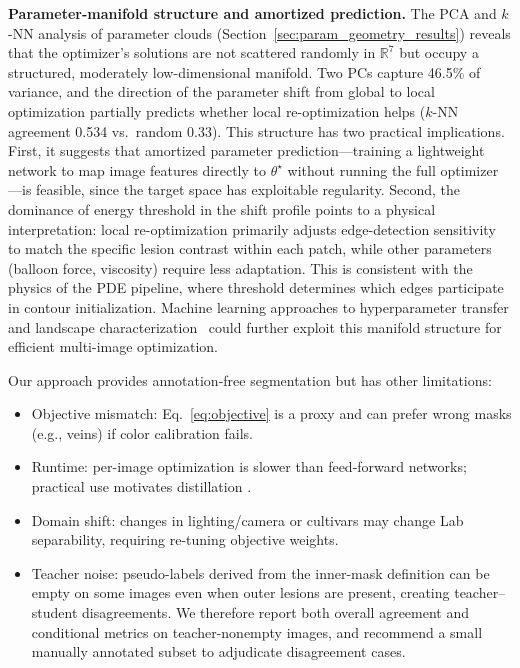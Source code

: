 \documentclass[11pt,a4paper]{article}
\newcommand{\R}{\mathbb{R}}
\begin{document}
\textbf{Parameter-manifold structure and amortized prediction.}
The PCA and $k$-NN analysis of parameter clouds (Section~\ref{sec:param_geometry_results}) reveals that the optimizer's solutions are not scattered randomly in $\R^7$ but occupy a structured, moderately low-dimensional manifold. Two PCs capture 46.5\% of variance, and the direction of the parameter shift from global to local optimization partially predicts whether local re-optimization helps ($k$-NN agreement 0.534 vs.\ random 0.33). This structure has two practical implications. First, it suggests that amortized parameter prediction---training a lightweight network to map image features directly to $\theta^\star$ without running the full optimizer---is feasible, since the target space has exploitable regularity. Second, the dominance of energy threshold in the shift profile points to a physical interpretation: local re-optimization primarily adjusts edge-detection sensitivity to match the specific lesion contrast within each patch, while other parameters (balloon force, viscosity) require less adaptation. This is consistent with the physics of the PDE pipeline, where threshold determines which edges participate in contour initialization. Machine learning approaches to hyperparameter transfer and landscape characterization~\citep{yu2020hyperparam,singh2016machine} could further exploit this manifold structure for efficient multi-image optimization.

Our approach provides annotation-free segmentation but has other limitations:
\begin{itemize}
    \item Objective mismatch: Eq.~\eqref{eq:objective} is a proxy and can prefer wrong masks (e.g., veins) if color calibration fails.
    \item Runtime: per-image optimization is slower than feed-forward networks; practical use motivates distillation \citep{hinton2015distilling}.
    \item Domain shift: changes in lighting/camera or cultivars may change Lab separability, requiring re-tuning objective weights.
    \item Teacher noise: pseudo-labels derived from the inner-mask definition can be empty on some images even when outer lesions are present, creating teacher--student disagreements. We therefore report both overall agreement and conditional metrics on teacher-nonempty images, and recommend a small manually annotated subset to adjudicate disagreement cases.
\end{itemize}
\end{document}
